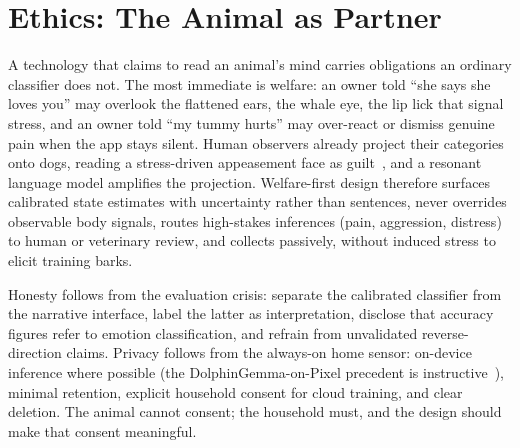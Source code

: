 \section{Ethics: The Animal as Partner}
\label{sec:ethics}

A technology that claims to read an animal's mind carries obligations an
ordinary classifier does not. The most immediate is welfare: an owner told
``she says she loves you'' may overlook the flattened ears, the whale eye,
the lip lick that signal stress, and an owner told ``my tummy hurts'' may
over-react or dismiss genuine pain when the app stays silent. Human
observers already project their categories onto dogs, reading a
stress-driven appeasement face as guilt~\cite{sci2022explainable,horowitz2009disambiguate},
and a resonant language model amplifies the projection. Welfare-first design therefore surfaces calibrated state
estimates with uncertainty rather than sentences, never overrides
observable body signals, routes high-stakes inferences (pain, aggression,
distress) to human or veterinary review, and collects passively, without
induced stress to elicit training barks.

Honesty follows from the evaluation crisis: separate the calibrated
classifier from the narrative interface, label the latter as
interpretation, disclose that accuracy figures refer to emotion
classification, and refrain from unvalidated reverse-direction claims.
Privacy follows from the always-on home sensor: on-device inference where
possible (the DolphinGemma-on-Pixel precedent is
instructive~\cite{google2025dolphingemma}), minimal retention, explicit
household consent for cloud training, and clear deletion. The animal cannot
consent; the household must, and the design should make that consent
meaningful.

